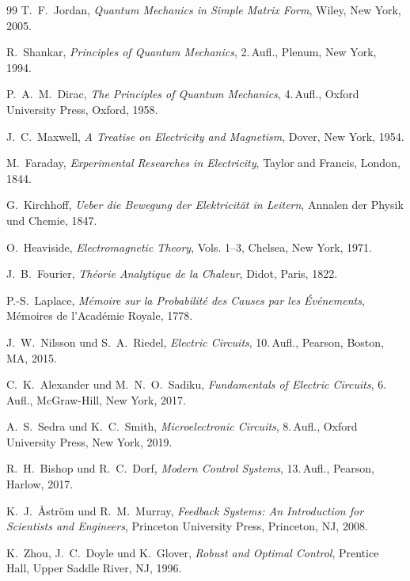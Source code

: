 \documentclass[a4paper,12pt,twoside]{report}
\theoremstyle{definition}
\begin{document}
\begin{thebibliography}{99}
	T.~F.~Jordan,
	\textit{Quantum Mechanics in Simple Matrix Form},
	Wiley, New York, 2005.

	R.~Shankar,
	\textit{Principles of Quantum Mechanics},
	2.\,Aufl., Plenum, New York, 1994.

	P.~A.~M.~Dirac,
	\textit{The Principles of Quantum Mechanics},
	4.\,Aufl., Oxford University Press, Oxford, 1958.

	J.~C.~Maxwell,
	\textit{A Treatise on Electricity and Magnetism},
	Dover, New York, 1954.

	M.~Faraday,
	\textit{Experimental Researches in Electricity},
	Taylor and Francis, London, 1844.

	G.~Kirchhoff,
	\textit{Ueber die Bewegung der Elektricität in Leitern},
	Annalen der Physik und Chemie, 1847.

	O.~Heaviside,
	\textit{Electromagnetic Theory},
	Vols. 1--3, Chelsea, New York, 1971.

	J.~B.~Fourier,
	\textit{Théorie Analytique de la Chaleur},
	Didot, Paris, 1822.

	P.-S.~Laplace,
	\textit{Mémoire sur la Probabilité des Causes par les Événements},
	Mémoires de l'Académie Royale, 1778.

	J.~W.~Nilsson und S.~A.~Riedel,
	\textit{Electric Circuits},
	10.\,Aufl., Pearson, Boston, MA, 2015.

	C.~K.~Alexander und M.~N.~O.~Sadiku,
	\textit{Fundamentals of Electric Circuits},
	6.\,Aufl., McGraw-Hill, New York, 2017.

	A.~S.~Sedra und K.~C.~Smith,
	\textit{Microelectronic Circuits},
	8.\,Aufl., Oxford University Press, New York, 2019.

	R.~H.~Bishop und R.~C.~Dorf,
	\textit{Modern Control Systems},
	13.\,Aufl., Pearson, Harlow, 2017.

	K.~J.~\AA str\"om und R.~M.~Murray,
	\textit{Feedback Systems: An Introduction for Scientists and Engineers},
	Princeton University Press, Princeton, NJ, 2008.

	K.~Zhou, J.~C.~Doyle und K.~Glover,
	\textit{Robust and Optimal Control},
	Prentice Hall, Upper Saddle River, NJ, 1996.


\end{thebibliography}
\end{document}
